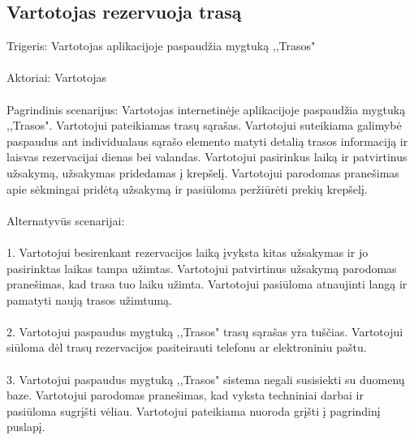 \documentclass[oneside]{VUMIFPSkursinis}
\begin{document}
\subsection{Vartotojas rezervuoja trasą}
	Trigeris: Vartotojas aplikacijoje paspaudžia mygtuką ,,Trasos"\\ \\
	Aktoriai: Vartotojas\\ \\
	Pagrindinis scenarijus: Vartotojas internetinėje aplikacijoje paspaudžia mygtuką ,,Trasos". Vartotojui pateikiamas trasų sąrašas. Vartotojui suteikiama galimybė paspaudus ant individualaus sąrašo elemento matyti detalią trasos informaciją ir laisvas rezervacijai dienas bei valandas. Vartotojui pasirinkus laiką ir patvirtinus užsakymą, užsakymas pridedamas į krepšelį. Vartotojui parodomas pranešimas apie sėkmingai pridėtą užsakymą ir pasiūloma peržiūrėti prekių krepšelį.\\ \\
	Alternatyvūs scenarijai:\\ \\
1. Vartotojui besirenkant rezervacijos laiką įvyksta kitas užsakymas ir jo pasirinktas laikas tampa užimtas. Vartotojui patvirtinus užsakymą parodomas pranešimas, kad trasa tuo laiku užimta. Vartotojui pasiūloma atnaujinti langą ir pamatyti naują trasos užimtumą.\\ \\
2. Vartotojui paspaudus mygtuką ,,Trasos" trasų sąrašas yra tuščias. Vartotojui siūloma dėl trasų rezervacijos pasiteirauti telefonu ar elektroniniu paštu.\\ \\
3. Vartotojui paspaudus mygtuką ,,Trasos" sistema negali susisiekti su duomenų baze. Vartotojui parodomas pranešimas, kad vyksta techniniai darbai ir pasiūloma sugrįšti vėliau. Vartotojui pateikiama nuoroda grįšti į pagrindinį puslapį.\\ \\
\end{document}
